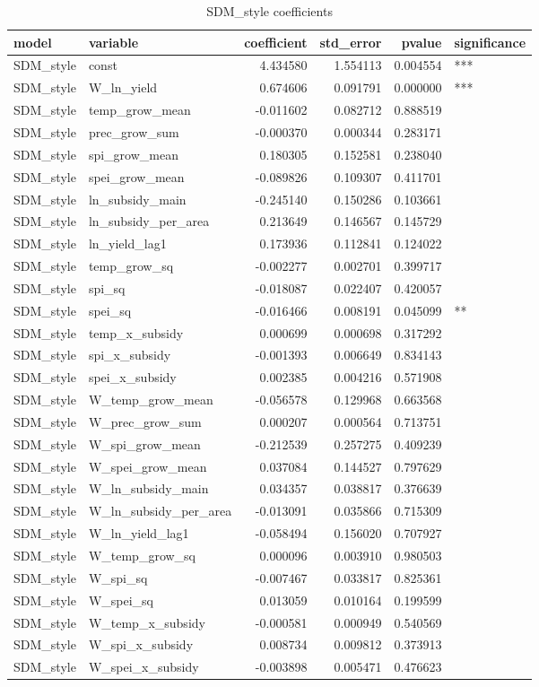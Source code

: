 \begin{table}
\caption{SDM_style coefficients}
\label{tab:SDM_style_coef}
\begin{tabular}{llrrrl}
\toprule
model & variable & coefficient & std_error & pvalue & significance \\
\midrule
SDM_style & const & 4.434580 & 1.554113 & 0.004554 & *** \\
SDM_style & W_ln_yield & 0.674606 & 0.091791 & 0.000000 & *** \\
SDM_style & temp_grow_mean & -0.011602 & 0.082712 & 0.888519 &  \\
SDM_style & prec_grow_sum & -0.000370 & 0.000344 & 0.283171 &  \\
SDM_style & spi_grow_mean & 0.180305 & 0.152581 & 0.238040 &  \\
SDM_style & spei_grow_mean & -0.089826 & 0.109307 & 0.411701 &  \\
SDM_style & ln_subsidy_main & -0.245140 & 0.150286 & 0.103661 &  \\
SDM_style & ln_subsidy_per_area & 0.213649 & 0.146567 & 0.145729 &  \\
SDM_style & ln_yield_lag1 & 0.173936 & 0.112841 & 0.124022 &  \\
SDM_style & temp_grow_sq & -0.002277 & 0.002701 & 0.399717 &  \\
SDM_style & spi_sq & -0.018087 & 0.022407 & 0.420057 &  \\
SDM_style & spei_sq & -0.016466 & 0.008191 & 0.045099 & ** \\
SDM_style & temp_x_subsidy & 0.000699 & 0.000698 & 0.317292 &  \\
SDM_style & spi_x_subsidy & -0.001393 & 0.006649 & 0.834143 &  \\
SDM_style & spei_x_subsidy & 0.002385 & 0.004216 & 0.571908 &  \\
SDM_style & W_temp_grow_mean & -0.056578 & 0.129968 & 0.663568 &  \\
SDM_style & W_prec_grow_sum & 0.000207 & 0.000564 & 0.713751 &  \\
SDM_style & W_spi_grow_mean & -0.212539 & 0.257275 & 0.409239 &  \\
SDM_style & W_spei_grow_mean & 0.037084 & 0.144527 & 0.797629 &  \\
SDM_style & W_ln_subsidy_main & 0.034357 & 0.038817 & 0.376639 &  \\
SDM_style & W_ln_subsidy_per_area & -0.013091 & 0.035866 & 0.715309 &  \\
SDM_style & W_ln_yield_lag1 & -0.058494 & 0.156020 & 0.707927 &  \\
SDM_style & W_temp_grow_sq & 0.000096 & 0.003910 & 0.980503 &  \\
SDM_style & W_spi_sq & -0.007467 & 0.033817 & 0.825361 &  \\
SDM_style & W_spei_sq & 0.013059 & 0.010164 & 0.199599 &  \\
SDM_style & W_temp_x_subsidy & -0.000581 & 0.000949 & 0.540569 &  \\
SDM_style & W_spi_x_subsidy & 0.008734 & 0.009812 & 0.373913 &  \\
SDM_style & W_spei_x_subsidy & -0.003898 & 0.005471 & 0.476623 &  \\
\bottomrule
\end{tabular}
\end{table}
